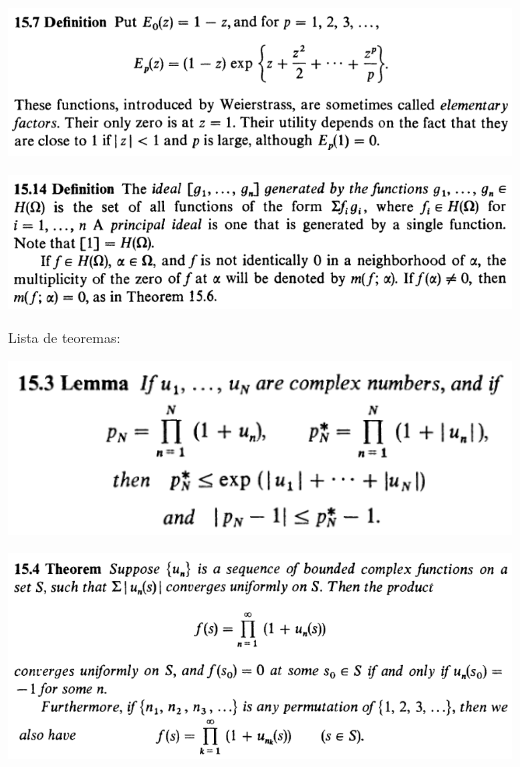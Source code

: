 \documentclass[12pt]{article}
\begin{document}
		\begin{center}
		\includegraphics{d15ponto7}
		\end{center}

		\begin{center}
		\includegraphics{d15ponto14}
		\end{center}

Lista de teoremas:

		\begin{center}
		\includegraphics{15ponto3}
		\end{center}

		\begin{center}
		\includegraphics{15ponto4}
		\end{center}
\end{document}
